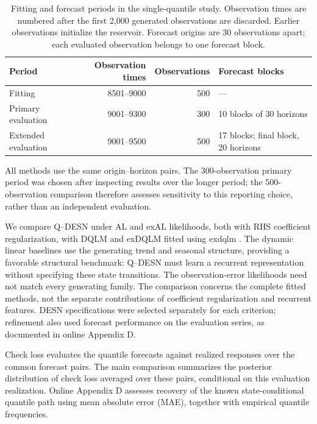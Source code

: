 \documentclass[12pt,letterpaper]{article}
\numberwithin{equation}{section}
\newcommand{\pkg}[1]{\textsf{#1}}
\begin{document}
\begin{table}[!htbp]
\centering
\small
\caption{Fitting and forecast periods in the single-quantile study.
Observation times are numbered after the first 2,000 generated observations
are discarded. Earlier observations initialize the reservoir. Forecast
origins are 30 observations apart; each evaluated observation belongs
to one forecast block.}
\label{tab:independent-sample-roles}
\begin{tabularx}{\textwidth}{@{}lrrY@{}}
\toprule
Period & Observation times & Observations & Forecast blocks \\
\midrule
Fitting & 8501--9000 & 500 & --- \\
Primary evaluation & 9001--9300 & 300 & 10 blocks of 30 horizons \\
Extended evaluation & 9001--9500 & 500 & 17 blocks; final block, 20 horizons \\
\bottomrule
\end{tabularx}
\end{table}

All methods use the same origin--horizon pairs. The 300-observation primary
period was chosen after inspecting results over the longer period; the
500-observation comparison therefore assesses sensitivity to this reporting
choice, rather than an independent evaluation.

We compare Q--DESN under AL and exAL likelihoods, both with RHS coefficient
regularization, with DQLM and exDQLM fitted using \pkg{exdqlm}
\citep{DeLeonEtAl2026Exdqlm}. The dynamic linear baselines use the generating
trend and seasonal structure, providing a favorable structural benchmark:
Q--DESN must learn a recurrent representation without specifying these state
transitions. The observation-error likelihoods need not match every
generating family. The comparison concerns the complete fitted methods,
not the separate contributions of coefficient regularization and recurrent
features. DESN specifications were selected separately for each criterion;
refinement also used forecast performance on the evaluation
series, as documented in online Appendix D.

Check loss evaluates the quantile forecasts against realized responses over
the common forecast pairs. The main comparison summarizes the posterior
distribution of check loss averaged over these pairs, conditional on this
evaluation realization. Online Appendix D assesses recovery of the known
state-conditional quantile path using mean absolute error (MAE), together
with empirical quantile frequencies.
\end{document}

